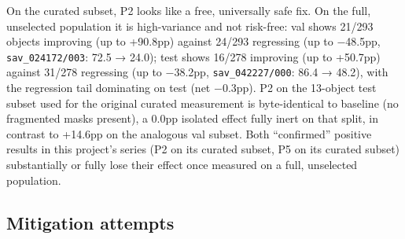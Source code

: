 \documentclass[11pt]{article}
\begin{document}
On the curated subset, P2 looks like a free, universally safe fix. On the full, unselected population it is high-variance and not risk-free: val shows 21/293 objects improving (up to +90.8pp) against 24/293 regressing (up to $-$48.5pp, \texttt{sav\_024172/003}: 72.5 → 24.0); test shows 16/278 improving (up to +50.7pp) against 31/278 regressing (up to $-$38.2pp, \texttt{sav\_042227/000}: 86.4 → 48.2), with the regression tail dominating on test (net $-$0.3pp). P2 on the 13-object test subset used for the original curated measurement is byte-identical to baseline (no fragmented masks present), a 0.0pp isolated effect fully inert on that split, in contrast to +14.6pp on the analogous val subset. Both ``confirmed'' positive results in this project's series (P2 on its curated subset, P5 on its curated subset) substantially or fully lose their effect once measured on a full, unselected population.

\subsection{Mitigation attempts}
\end{document}
